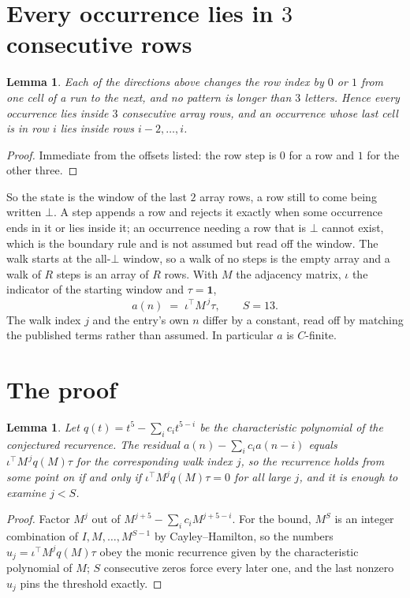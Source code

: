 \documentclass[11pt,a4paper]{article}
\theoremstyle{plain}
\newtheorem{lemma}[theorem]{Lemma}
\theoremstyle{definition}
\begin{document}
\section{Every occurrence lies in $3$ consecutive rows}

\begin{lemma}\label{lem:win}
Each of the directions above changes the row index by $0$ or $1$ from one cell of a run to the
next, and no pattern is longer than $3$ letters. Hence every occurrence lies inside $3$
consecutive array rows, and an occurrence whose last cell is in row $i$ lies inside rows
$i-2,\dots,i$.
\end{lemma}

\begin{proof}
Immediate from the offsets listed: the row step is $0$ for a row and $1$ for the other three.
\end{proof}

So the state is the window of the last $2$ array rows, a row still to come being written
$\bot$. A step appends a row and rejects it exactly when some occurrence ends in it or lies
inside it; an occurrence needing a row that is $\bot$ cannot exist, which is the boundary rule
and is not assumed but read off the window. The walk starts at the all-$\bot$ window, so a walk
of no steps is the empty array and a walk of $R$ steps is an array of $R$ rows. With $M$ the
adjacency matrix, $\iota$ the indicator of the starting window and $\tau=\mathbf{1}$,
\[
a(n)\;=\;\iota^{\!\top}M^{\,j}\tau ,\qquad S=13.
\]
The walk index $j$ and the entry's own $n$ differ by a constant, read off by matching the
published terms rather than assumed. In particular $a$ is $C$-finite.

\section{The proof}

\begin{lemma}\label{lem:crit}
Let $q(t)=t^{5}-\sum_i c_it^{5-i}$ be the characteristic polynomial of the
conjectured recurrence. The residual $a(n)-\sum_ic_ia(n-i)$ equals
$\iota^{\!\top}M^{\,j}q(M)\tau$ for the corresponding walk index $j$, so the recurrence
holds from some point on if and only if $\iota^{\!\top}M^{j}q(M)\tau=0$ for all large $j$,
and it is enough to examine $j<S$.
\end{lemma}

\begin{proof}
Factor $M^{j}$ out of $M^{j+5}-\sum_ic_iM^{j+5-i}$. For the bound, $M^{S}$
is an integer combination of $I,M,\dots,M^{S-1}$ by Cayley--Hamilton, so the numbers
$u_j=\iota^{\!\top}M^{j}q(M)\tau$ obey the monic recurrence given by the characteristic
polynomial of $M$; $S$ consecutive zeros force every later one, and the last nonzero $u_j$
pins the threshold exactly.
\end{proof}
\end{document}
